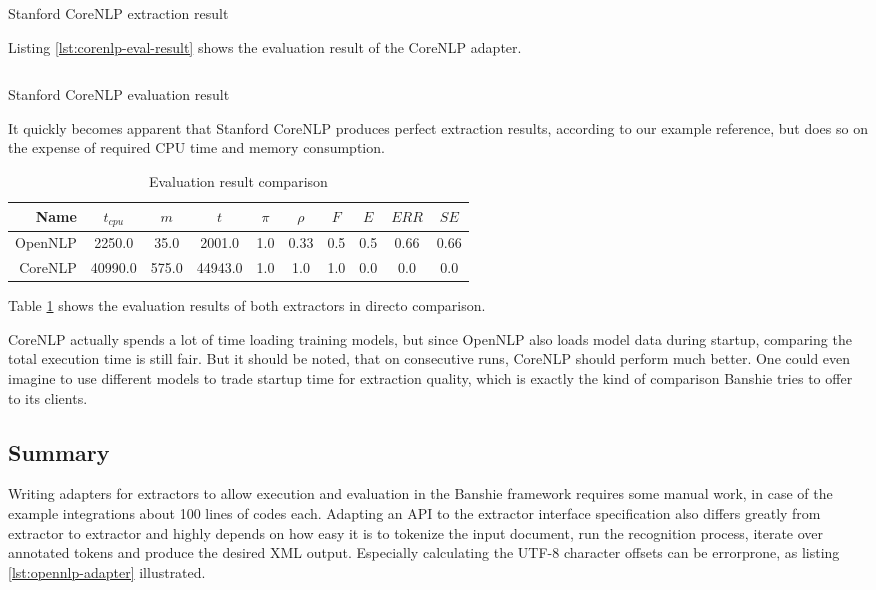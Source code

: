 \begin{listing}[H]
\inputminted{xml}{corenlp.xml}
\caption{Stanford CoreNLP extraction result}
\label{lst:corenlp-result}
\end{listing}

\newpage
Listing \ref{lst:corenlp-eval-result} shows the evaluation result of the CoreNLP adapter.

\begin{listing}[H]
\inputminted{java}{corenlp.txt}
\caption{Stanford CoreNLP evaluation result}
\label{lst:corenlp-eval-result}
\end{listing}

It quickly becomes apparent that Stanford CoreNLP produces perfect extraction results, according to our example reference, but does so on the expense of required CPU time and memory consumption. 

\begin{table}[H]
\centering
\begin{tabular*}{\textwidth}{rccccccccc}
	\toprule
	Name & $t_{cpu}$ & $m$ & $t$ & $\pi$ & $\rho$ & $F$ & $E$ & $ERR$ & $SE$ \\
	\midrule
	OpenNLP & 2250.0 & 35.0 & 2001.0 & 1.0 & 0.33 & 0.5 & 0.5 & 0.66 & 0.66 \\ 
	CoreNLP & 40990.0 & 575.0 & 44943.0 & 1.0 & 1.0 & 1.0 & 0.0 & 0.0 & 0.0 \\
	\bottomrule
\end{tabular*}
\caption{Evaluation result comparison}
\label{tbl:result-comparison}
\end{table}

Table \ref{tbl:result-comparison} shows the evaluation results of both extractors in directo comparison.

CoreNLP actually spends a lot of time loading training models, but since OpenNLP also loads model data during startup, comparing the total execution time is still fair. But it should be noted, that on consecutive runs, CoreNLP should perform much better. One could even imagine to use different models to trade startup time for extraction quality, which is exactly the kind of comparison Banshie tries to offer to its clients.

\newpage
\subsection{Summary}
Writing adapters for extractors to allow execution and evaluation in the Banshie framework requires some manual work, in case of the example integrations about 100 lines of codes each. Adapting an \gls{API} to the extractor interface specification also differs greatly from extractor to extractor and highly depends on how easy it is to tokenize the input document, run the recognition process, iterate over annotated tokens and produce the desired \gls{XML} output. Especially calculating the UTF-8 character offsets can be errorprone, as listing \ref{lst:opennlp-adapter} illustrated.

